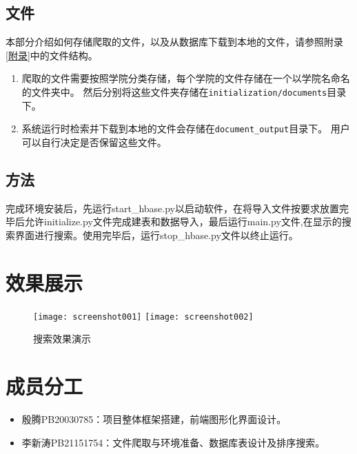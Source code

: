 \documentclass{article}
\begin{document}
	\subsection{文件}
	本部分介绍如何存储爬取的文件，以及从数据库下载到本地的文件，请参照附录\ref{附录}中的文件结构。
		\begin{enumerate}
			\item
			爬取的文件需要按照学院分类存储，每个学院的文件存储在一个以学院名命名的文件夹中。
			然后分别将这些文件夹存储在\texttt{initialization/documents}目录下。
			\item
			系统运行时检索并下载到本地的文件会存储在\texttt{document\_output}目录下。
			用户可以自行决定是否保留这些文件。
		\end{enumerate}
	
	\subsection{方法}
	完成环境安装后，先运行start\_hbase.py以启动软件，在将导入文件按要求放置完毕后允许initialize.py文件完成建表和数据导入，最后运行main.py文件,在显示的搜索界面进行搜索。使用完毕后，运行stop\_hbase.py文件以终止运行。
	
	
	\section{效果展示}
	\begin{figure}[h]
		\centering
		\texttt{[image: screenshot001]}
		\texttt{[image: screenshot002]}
		\caption{搜索效果演示}
		\label{fig:screenshot001}
	\end{figure}
	
	\section{成员分工}
	\begin{itemize}
		\item 殷腾PB20030785：项目整体框架搭建，前端图形化界面设计。
		\item 李新涛PB21151754：文件爬取与环境准备、数据库表设计及排序搜索。
	\end{itemize}
	
\end{document}
